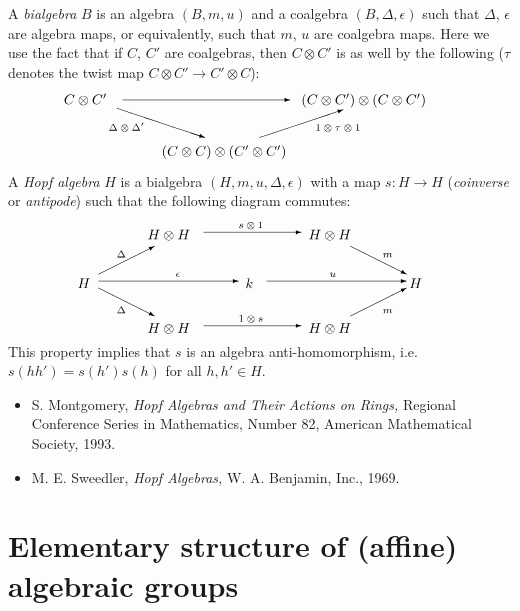 \documentclass[12pt]{amsart}
\begin{document}
A {\em bialgebra} $B$ is an algebra $(B,m,u)$
and a coalgebra $(B,\Delta,\epsilon)$ such that $\Delta$,
$\epsilon$ are algebra maps, or equivalently, such that $m$, $u$
are coalgebra maps.  Here we use the fact that if $C$, $C'$ are coalgebras,
then $C\otimes C'$ is as well by the following ($\tau$ denotes the twist
map $C\otimes C'\rightarrow C'\otimes C$):
$$
\begin{picture}(280,47)
\put(0,37){$C\otimes C'$}
\put(170,37){$(C\otimes C')\otimes(C\otimes C')$}
\put(70,0){$(C\otimes C)\otimes (C'\otimes C')$}
\put(42,40){\vector(1,0){120}}
\put(38,34){\vector(3,-1){63}}
\put(140,13){\vector(3,1){60}}
\put(32,18){\scriptsize $\Delta\otimes\Delta'$} 
\put(180,18){\scriptsize $1\otimes\tau\otimes 1$} 
\end{picture}
$$

A {\em Hopf algebra} $H$ is a bialgebra $(H,m,u,\Delta,
\epsilon)$ with a map $s:H\rightarrow
H$ ({\em coinverse} or {\em antipode}) such that the following diagram 
commutes:
$$
\begin{picture}(260,81)
\put(0,32){$H$}    \put(120,32){$k$}     \put(237,32){$H$}
\put( 50,67){$H\otimes H$}   \put( 50, 0){$H\otimes H$}
\put(165,67){$H\otimes H$}   \put(165, 0){$H\otimes H$}
\put(15,37){\vector(1,0){100}}  \put(135,37){\vector(1,0){100}}
\put(90,5){\vector(1,0){70}}  \put(90,72){\vector(1,0){70}}
\put(15,32){\vector(2,-1){40}} \put(195,62){\vector(2,-1){40}}
\put(15,42){\vector(2, 1){40}} \put(195,12){\vector(2, 1){40}}
\put(28,14){\scriptsize$\Delta$}\put(28,54){\scriptsize$\Delta$}
\put(218,14){\scriptsize$m$}   \put(218,54){\scriptsize$m$}
\put(115,8){\scriptsize$1\otimes s$}\put(115,75){\scriptsize$s\otimes 1$}
\put(70,40){\scriptsize$\epsilon$} \put(180,40){\scriptsize$u$} 
\end{picture}
$$
This property implies that $s$ is an algebra anti-homomorphism, i.e.
$s(hh')=s(h')s(h)$ for all $h,h'\in H$.

\begin{itemize}
\item[] S. Montgomery, {\em Hopf Algebras and Their Actions on
Rings,} Regional Conference Series in Mathematics, Number 82, American
Mathematical Society, 1993.
 
\item[]
M. E. Sweedler, {\em Hopf Algebras,} W. A. Benjamin, Inc., 1969.
\end{itemize}




\section{Elementary structure of (affine) algebraic groups}
\end{document}
